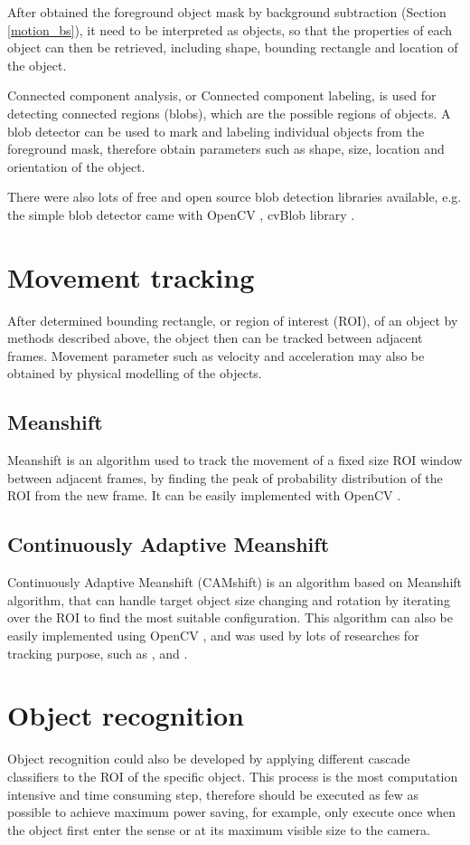 After obtained the foreground object mask by background subtraction (Section \ref{motion_bs}), it need to be interpreted as objects, so that the properties of each object can then be retrieved, including shape, bounding rectangle and location of the object.

Connected component analysis, or Connected component labeling, is used for detecting connected regions (blobs), which are the possible regions of objects. A blob detector can be used to mark and labeling individual objects from the foreground mask, therefore obtain parameters such as shape, size, location and orientation of the object.

There were also lots of free and open source blob detection libraries available, e.g. the simple blob detector came with OpenCV \cite{opencv:blob}, cvBlob library \cite{cvblob}.

\section{Movement tracking}
\label{bg:tracking}

After determined bounding rectangle, or region of interest (ROI), of an object by methods described above, the object then can be tracked between adjacent frames. Movement parameter such as velocity and acceleration may also be obtained by physical modelling of the objects.

\subsection{Meanshift}

Meanshift \cite{fukunaga2013introduction} is an algorithm used to track the movement of a fixed size ROI window between adjacent frames, by finding the peak of probability distribution of the ROI from the new frame. It can be easily implemented with OpenCV \cite{opencv:camshift}.

\subsection{Continuously Adaptive Meanshift}

Continuously Adaptive Meanshift (CAMshift) \cite{bradski1998computer} is an algorithm based on Meanshift algorithm, that can handle target object size changing and rotation by iterating over the ROI to find the most suitable configuration. This algorithm can also be easily implemented using OpenCV \cite{opencv:camshift}, and was used by lots of researches for tracking purpose, such as \cite{chu2007object}, \cite{xu2012moving} and \cite{nouar2006improved}.

\section{Object recognition}

Object recognition could also be developed by applying different cascade classifiers to the ROI of the specific object. This process is the most computation intensive and time consuming step, therefore should be executed as few as possible to achieve maximum power saving, for example, only execute once when the object first enter the sense or at its maximum visible size to the camera.
